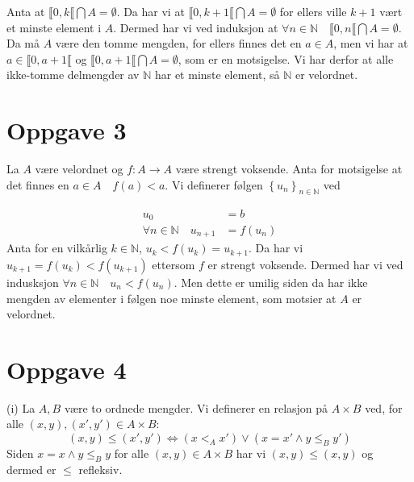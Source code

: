 \documentclass{article}[norsk]
\begin{document}
Anta at $\llbracket 0,k\llbracket\bigcap A=\emptyset$. Da har vi at $\llbracket 0,k+1\llbracket\bigcap A=\emptyset$ for ellers ville $k+1$ vært et minste element i $A$. Dermed har vi ved induksjon at $\forall n\in\mathbb{N}\quad\llbracket 0,n\llbracket\bigcap A=\emptyset$. Da må $A$ være den tomme mengden, for ellers finnes det en $a\in A$, men vi har at $a\in\llbracket 0,a+1\llbracket$ og  $\llbracket 0,a+1\llbracket\bigcap A=\emptyset$, som er en motsigelse. Vi har derfor at alle ikke-tomme delmengder av $\mathbb{N}$ har et minste element, så $\mathbb{N}$ er velordnet.

\section*{Oppgave 3}
La $A$ være velordnet og $f:A\rightarrow A$ være strengt voksende. Anta for motsigelse at det finnes en $a\in A\quad f(a)<a$. Vi definerer følgen $\left\{u_n\right\}_{n\in\mathbb{N}}$ ved 

\begin{equation*} \begin{aligned}
u_0 &= b\\
\forall n\in \mathbb{N}\quad u_{n+1} &= f(u_n)
\end{aligned} \end{equation*}
Anta for en vilkårlig $k\in\mathbb{N}$, $u_k < f(u_k)=u_{k+1}$. Da har vi $u_{k+1} = f(u_k) < f(u_{k+1})$ ettersom $f$ er strengt voksende. Dermed har vi ved indusksjon $\forall n\in\mathbb{N}\quad u_n<f(u_n)$. Men dette er umilig siden da har ikke mengden av elementer i følgen noe minste element, som motsier at $A$ er velordnet.
\section*{Oppgave 4}
(i) %
La $A,B$ være to ordnede mengder. Vi definerer en relasjon på $A\times B$ ved, for alle $(x,y),(x',y')\in A\times B$:
\begin{equation*}
(x,y)\leq(x',y')\Longleftrightarrow (x<_A x')\vee (x=x' \wedge y\leq_B y')
\end{equation*}
Siden $x=x\wedge y\leq_B y$ for alle $(x,y)\in A\times B$ har vi $(x,y)\leq(x,y)$ og dermed er $\leq$ refleksiv.
\end{document}
